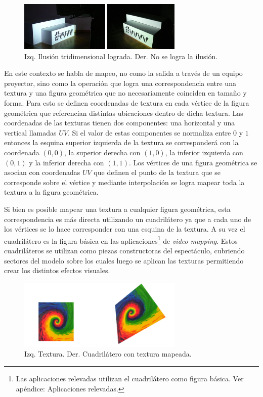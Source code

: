 \begin{figure}[H]
  \centering
    \includegraphics[width=0.7\textwidth]{./Cap2_videomapping/3dillusion}
  \caption[http://vvvv.org]{Izq. Ilusión tridimensional lograda. Der. No se logra la ilusión.}
  \label{fig:3dillusion}
\end{figure}

En este contexto se habla de mapeo, no como la salida a través de un equipo proyector, sino como la operación que logra una correspondencia entre una textura y una figura geométrica que no necesariamente coinciden en tamaño y forma. Para esto se definen coordenadas de textura en cada vértice de la figura geométrica que referencian distintas ubicaciones dentro de dicha textura.
Las coordenadas de las texturas tienen dos componentes: una horizontal y una vertical llamadas $UV$. Si el valor de estas componentes se normaliza entre $0$ y $1$ entonces la esquina superior izquierda de la textura se corresponderá con la coordenada $(0,0)$, la superior derecha con $(1,0)$, la inferior izquierda con $(0,1)$ y la inferior derecha con $(1,1)$.
Los vértices de una figura geométrica se asocian con coordenadas $UV$ que definen el punto de la textura que se corresponde sobre el vértice y mediante interpolación se logra mapear toda la textura a la figura geométrica.

Si bien es posible mapear una textura a cualquier figura geométrica, esta correspondencia es más directa utilizando un cuadrilátero ya que a cada uno de los vértices se lo hace corresponder con una esquina de la textura. A su vez el cuadrilátero es la figura básica en las aplicaciones\footnote{Las aplicaciones relevadas utilizan el cuadrilátero como figura básica. Ver apéndice: Aplicaciones relevadas.} de \emph{video mapping}.
Estos cuadriláteros se utilizan como piezas constructoras del espectáculo, cubriendo sectores del modelo sobre los cuales luego se aplican las texturas permitiendo crear los distintos efectos visuales.

\begin{figure}[H]
  \centering
    \includegraphics[width=0.7\textwidth]{./Cap2_videomapping/2dmapping}
  \caption[Imagen propia.]{Izq. Textura. Der. Cuadrilátero con textura mapeada.}
  \label{fig:2dmapping}
\end{figure}

